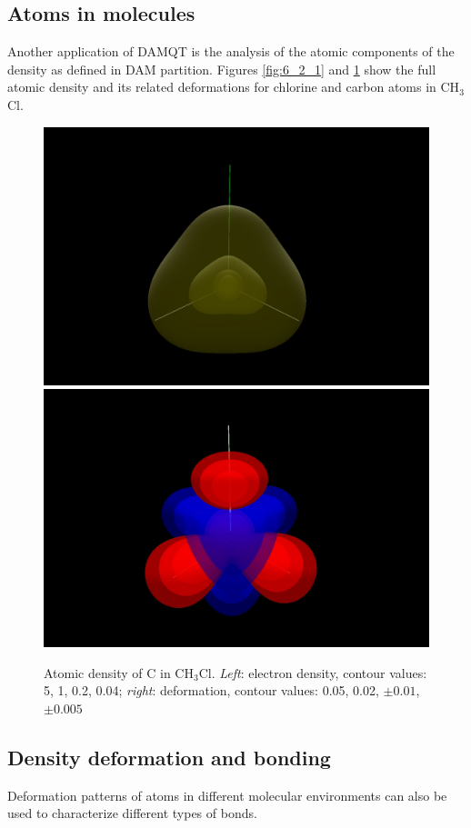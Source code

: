 \documentclass[10pt]{article}
\begin{document}
\subsection{Atoms in molecules \label{sec:6.2}}

Another application of DAMQT is the analysis of the atomic components
of the density as defined in DAM partition. Figures \ref{fig:6_2_1} and
\ref{fig:6_2_2} show the full atomic density and its related deformations for
chlorine and carbon atoms in CH$_3$Cl.

\vspace*{5mm}
\begin{figure}[H]
\begin{center}
\includegraphics[width=.3\linewidth]{CH3Cl-pVTZ-d-C.png}
\hspace*{5mm}
\includegraphics[width=.3\linewidth]{CH3Cl-pVTZ-def-C.png}
\end{center}
\caption[Atomic density of C in CH$_3$Cl]{ Atomic density of C in CH$_3$Cl. {\it Left}: electron density,
contour values: 5, 1, 0.2, 0.04; {\it right}: deformation, contour values:
0.05, 0.02, $\pm 0.01$, $\pm 0.005$
\label{fig:6_2_2}}
\end{figure}

\subsection{Density deformation and bonding \label{sec:6.3}}

Deformation patterns of atoms in different molecular
environments can also be used to characterize different types of bonds.
\end{document}
